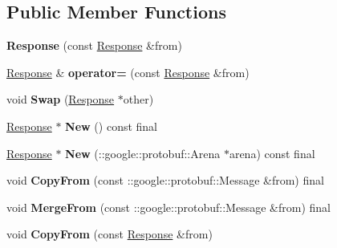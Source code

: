 \subsection*{Public Member Functions}
\begin{DoxyCompactItemize}
\item 
\mbox{\label{classcoappbrpc_1_1Response_a24904bb0f0787fce30908baa49edc716}} 
{\bfseries Response} (const \hyperlink{classcoappbrpc_1_1Response}{Response} \&from)
\item 
\mbox{\label{classcoappbrpc_1_1Response_a61b7fa1a0db69410c56d5fe68780c672}} 
\hyperlink{classcoappbrpc_1_1Response}{Response} \& {\bfseries operator=} (const \hyperlink{classcoappbrpc_1_1Response}{Response} \&from)
\item 
\mbox{\label{classcoappbrpc_1_1Response_a8c4a23436a8b69a56ae78b77275b6c73}} 
void {\bfseries Swap} (\hyperlink{classcoappbrpc_1_1Response}{Response} $\ast$other)
\item 
\mbox{\label{classcoappbrpc_1_1Response_a5376077cc9b1c06db82f865bbdde3393}} 
\hyperlink{classcoappbrpc_1_1Response}{Response} $\ast$ {\bfseries New} () const final
\item 
\mbox{\label{classcoappbrpc_1_1Response_abd3c0c6327b76e29a6346ed2c4a3a799}} 
\hyperlink{classcoappbrpc_1_1Response}{Response} $\ast$ {\bfseries New} (\+::google\+::protobuf\+::\+Arena $\ast$arena) const final
\item 
\mbox{\label{classcoappbrpc_1_1Response_acd3ee1f81b27d08c0ffb155bdb9b3c1d}} 
void {\bfseries Copy\+From} (const \+::google\+::protobuf\+::\+Message \&from) final
\item 
\mbox{\label{classcoappbrpc_1_1Response_ad20d2e5d879b0a4d6cd313b4da6618a1}} 
void {\bfseries Merge\+From} (const \+::google\+::protobuf\+::\+Message \&from) final
\item 
\mbox{\label{classcoappbrpc_1_1Response_a3a27916c27b9cf8e3a437d1cbd1147c4}} 
void {\bfseries Copy\+From} (const \hyperlink{classcoappbrpc_1_1Response}{Response} \&from)

\end{DoxyCompactItemize}
